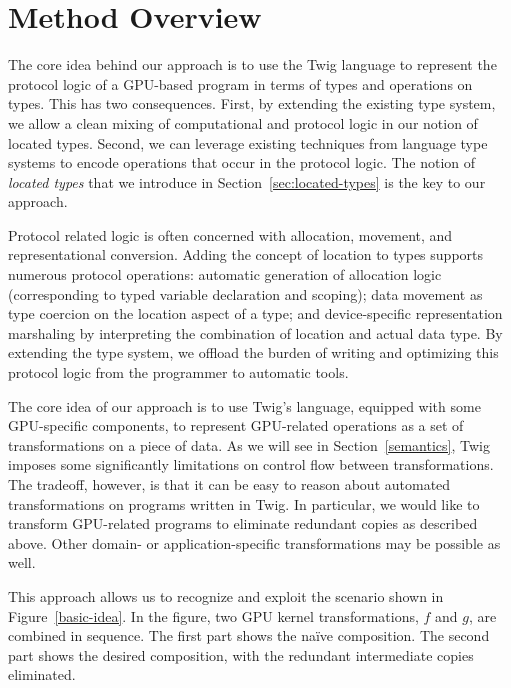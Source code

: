 
\section{Method Overview}


The core idea behind our approach is to use the Twig language to represent the
protocol logic of a GPU-based program in terms of types and operations on types.
This has two consequences. First, by extending the existing type system, we
allow a clean mixing of computational and protocol logic in our notion of
located types. Second, we can leverage existing techniques from language type
systems to encode operations that occur in the protocol logic. The notion of
\emph{located types} that we introduce in Section~\ref{sec:located-types} is the
key to our approach.

Protocol related logic is often concerned with allocation, movement, and
representational conversion. Adding the concept of location to types supports
numerous protocol operations: automatic generation of allocation logic
(corresponding to typed variable declaration and scoping); data movement as type
coercion on the location aspect of a type; and device-specific representation
marshaling by interpreting the combination of location and actual data type. By
extending the type system, we offload the burden of writing and optimizing this
protocol logic from the programmer to automatic tools.



The core idea of our approach is to use Twig's language, equipped with some
GPU-specific components, to represent GPU-related operations as a set of
transformations on a piece of data. As we will see in Section~\ref{semantics},
Twig imposes some significantly limitations on control flow between
transformations. The tradeoff, however, is that it can be easy to reason about
automated transformations on programs written in Twig. In particular, we would
like to transform GPU-related programs to eliminate redundant copies as
described above. Other domain- or application-specific transformations may be
possible as well.

This approach allows us to recognize and exploit the scenario shown in
Figure~\ref{basic-idea}. In the figure, two GPU kernel transformations, $f$ and
$g$, are combined in sequence. The first part shows the na\"ive composition. The
second part shows the desired composition, with the redundant intermediate
copies eliminated.

